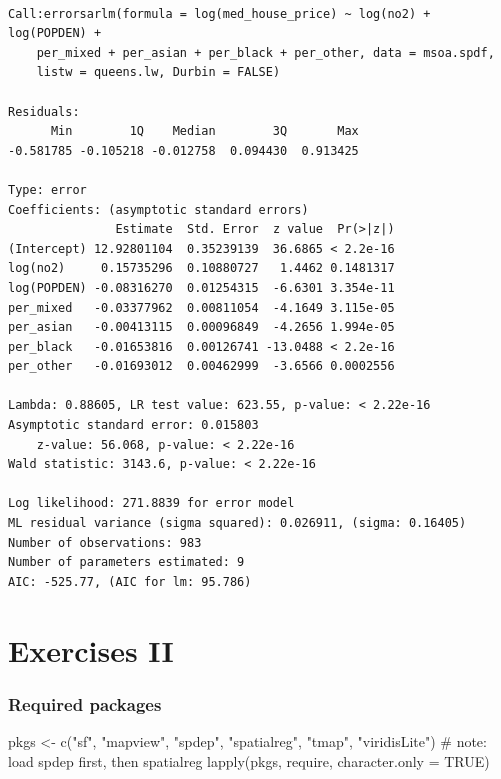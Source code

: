 \documentclass[
  letterpaper,
  DIV=11,
  numbers=noendperiod]{scrreprt}
\newenvironment{Shaded}{\begin{snugshade}}{\end{snugshade}}
\newcommand{\AttributeTok}[1]{\textcolor[rgb]{0.40,0.45,0.13}{#1}}
\newcommand{\CommentTok}[1]{\textcolor[rgb]{0.37,0.37,0.37}{#1}}
\newcommand{\ConstantTok}[1]{\textcolor[rgb]{0.56,0.35,0.01}{#1}}
\newcommand{\FunctionTok}[1]{\textcolor[rgb]{0.28,0.35,0.67}{#1}}
\newcommand{\NormalTok}[1]{\textcolor[rgb]{0.00,0.23,0.31}{#1}}
\newcommand{\OtherTok}[1]{\textcolor[rgb]{0.00,0.23,0.31}{#1}}
\newcommand{\StringTok}[1]{\textcolor[rgb]{0.13,0.47,0.30}{#1}}
\begin{document}
\begin{verbatim}

Call:errorsarlm(formula = log(med_house_price) ~ log(no2) + log(POPDEN) + 
    per_mixed + per_asian + per_black + per_other, data = msoa.spdf, 
    listw = queens.lw, Durbin = FALSE)

Residuals:
      Min        1Q    Median        3Q       Max 
-0.581785 -0.105218 -0.012758  0.094430  0.913425 

Type: error 
Coefficients: (asymptotic standard errors) 
               Estimate  Std. Error  z value  Pr(>|z|)
(Intercept) 12.92801104  0.35239139  36.6865 < 2.2e-16
log(no2)     0.15735296  0.10880727   1.4462 0.1481317
log(POPDEN) -0.08316270  0.01254315  -6.6301 3.354e-11
per_mixed   -0.03377962  0.00811054  -4.1649 3.115e-05
per_asian   -0.00413115  0.00096849  -4.2656 1.994e-05
per_black   -0.01653816  0.00126741 -13.0488 < 2.2e-16
per_other   -0.01693012  0.00462999  -3.6566 0.0002556

Lambda: 0.88605, LR test value: 623.55, p-value: < 2.22e-16
Asymptotic standard error: 0.015803
    z-value: 56.068, p-value: < 2.22e-16
Wald statistic: 3143.6, p-value: < 2.22e-16

Log likelihood: 271.8839 for error model
ML residual variance (sigma squared): 0.026911, (sigma: 0.16405)
Number of observations: 983 
Number of parameters estimated: 9 
AIC: -525.77, (AIC for lm: 95.786)
\end{verbatim}


\hypertarget{exercises-ii}{%
\chapter{Exercises II}\label{exercises-ii}}

\newcommand{\Exp}{\mathrm{E}}
\newcommand\given[1][]{\:#1\vert\:}
\newcommand{\Cov}{\mathrm{Cov}}
\newcommand{\Var}{\mathrm{Var}}
\newcommand{\rank}{\mathrm{rank}}
\newcommand{\bm}[1]{\boldsymbol{\mathbf{#1}}}

\hypertarget{required-packages-7}{%
\subsection*{Required packages}\label{required-packages-7}}

\begin{Shaded}
\begin{Highlighting}[]
\NormalTok{pkgs }\OtherTok{\textless{}{-}} \FunctionTok{c}\NormalTok{(}\StringTok{"sf"}\NormalTok{, }\StringTok{"mapview"}\NormalTok{, }\StringTok{"spdep"}\NormalTok{, }\StringTok{"spatialreg"}\NormalTok{, }\StringTok{"tmap"}\NormalTok{, }\StringTok{"viridisLite"}\NormalTok{) }\CommentTok{\# note: load spdep first, then spatialreg}
\FunctionTok{lapply}\NormalTok{(pkgs, require, }\AttributeTok{character.only =} \ConstantTok{TRUE}\NormalTok{)}
\end{Highlighting}
\end{Shaded}
\end{document}
